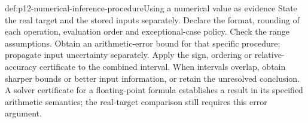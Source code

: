 \begin{hbmethod}{def:p12-numerical-inference-procedure}{Using a numerical value as evidence}
State the real target and the stored inputs separately. Declare the format,
rounding of each operation, evaluation order and exceptional-case policy.
Check the range assumptions. Obtain an arithmetic-error bound for that
specific procedure; propagate input uncertainty separately. Apply the
sign, ordering or relative-accuracy certificate to the combined interval.
When intervals overlap, obtain sharper bounds or better input information,
or retain the unresolved conclusion. A solver certificate for a floating-point
formula establishes a result in its specified arithmetic semantics; the
real-target comparison still requires this error argument.
\end{hbmethod}

